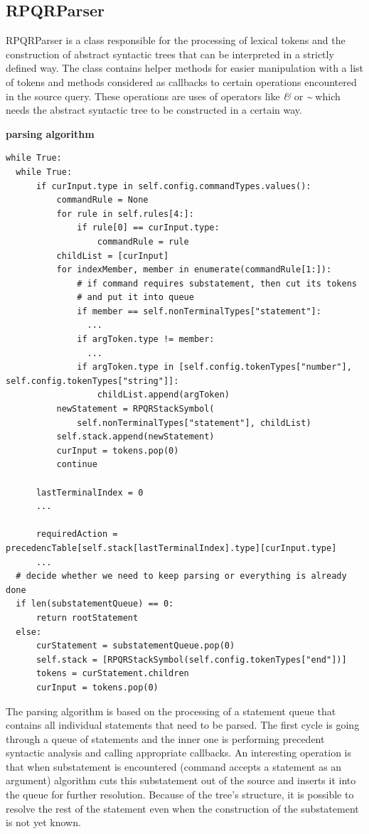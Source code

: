 \subsection*{RPQRParser}

RPQRParser is a class responsible for the processing of lexical tokens and the construction of abstract syntactic
trees that can be interpreted in a strictly defined way. The class contains helper methods for easier
manipulation with a list of tokens and methods considered as callbacks to certain operations encountered
in the source query. These operations are uses of operators like \textit{\&} or \textit{\textasciitilde}
which needs the abstract syntactic tree to be constructed in a certain way.

\textbf{parsing algorithm}

\begin{lstlisting}
while True:
  while True:
      if curInput.type in self.config.commandTypes.values():
          commandRule = None
          for rule in self.rules[4:]:
              if rule[0] == curInput.type:
                  commandRule = rule
          childList = [curInput]
          for indexMember, member in enumerate(commandRule[1:]):
              # if command requires substatement, then cut its tokens
              # and put it into queue
              if member == self.nonTerminalTypes["statement"]:
                ...
              if argToken.type != member:
                ...
              if argToken.type in [self.config.tokenTypes["number"], self.config.tokenTypes["string"]]:
                  childList.append(argToken)
          newStatement = RPQRStackSymbol(
              self.nonTerminalTypes["statement"], childList)
          self.stack.append(newStatement)
          curInput = tokens.pop(0)
          continue

      lastTerminalIndex = 0
      ...

      requiredAction = precedencTable[self.stack[lastTerminalIndex].type][curInput.type]
      ...
  # decide whether we need to keep parsing or everything is already done
  if len(substatementQueue) == 0:
      return rootStatement
  else:
      curStatement = substatementQueue.pop(0)
      self.stack = [RPQRStackSymbol(self.config.tokenTypes["end"])]
      tokens = curStatement.children
      curInput = tokens.pop(0)
\end{lstlisting}

The parsing algorithm is based on the processing of a statement queue that contains all individual statements
that need to be parsed. The first cycle is going through a queue of statements and the inner one is
performing precedent syntactic analysis and calling appropriate callbacks. An interesting operation is
that when substatement is encountered (command accepts a statement as an argument) algorithm cuts this
substatement out of the source and inserts it into the queue for further resolution. Because of the tree's structure, it is possible to resolve the rest of the statement even when the construction of the substatement is not yet
known.

